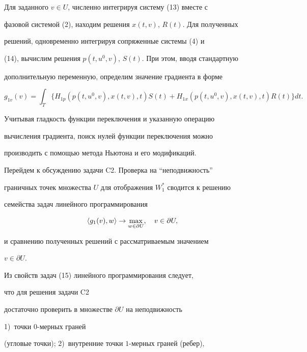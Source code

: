  


Для заданного $v\in U$, численно интегрируя систему (13) вместе с 


фазовой системой (2), находим решения $x(t,v)$, $R(t)$. Для полученных 


решений, одновременно интегрируя сопряженные системы (4) и 


(14), вычислим решения $p(t,u^0,v)$, $S(t)$. При этом, вводя стандартную 


дополнительную переменную, определим значение градиента в форме 


$$ 


g_{1v}(v)=\int_T\{H_{1p}(p(t,u^0,v),x(t,v),t)S(t)+ 


H_{1x}(p(t,u^0,v),x(t,v),t)R(t)\}d t. 


$$ 


Учитывая гладкость функции переключения и указанную операцию 


вычисления градиента, поиск нулей функции переключения можно 


производить с помощью метода Ньютона и его модификаций. 


 


Перейдем к обсуждению задачи C2. Проверка на ``неподвижность'' 


граничных точек множества $U$ для отображения $W^*_1$ сводится к решению 


семейства задач линейного программирования 


\begin{equation} 


\la g_1(v),w\ra\to\max_{w\in\partial U},\quad v\in\partial U, 


\end{equation} 


и сравнению полученных решений с рассматриваемым значением 


$v\in\partial U$. 


 


 


Из свойств задач (15) линейного программирования следует, 


что для решения задачи C2 


достаточно проверить в множестве $\partial U$ на неподвижность 


1)~точки $0$-мерных граней 


(угловые точки); 2)~внутренние точки $1$-мерных граней (ребер), 


